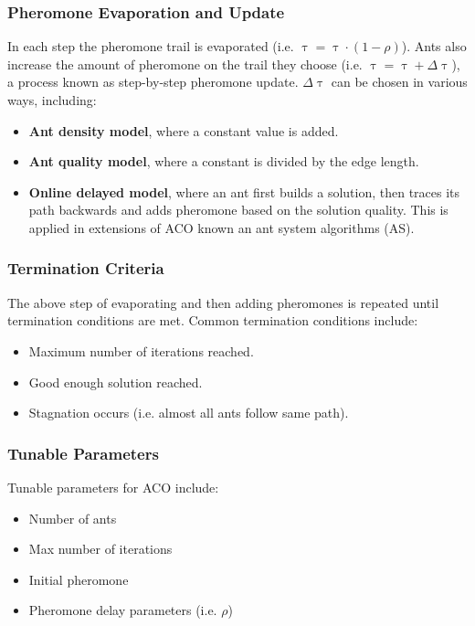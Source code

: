 \documentclass[12pt,titlepage]{article}
\begin{document}
      \subsubsection{Pheromone Evaporation and Update}
        In each step the pheromone trail is evaporated (i.e. $\uptau = \uptau \cdot (1 - \rho)$). Ants also increase the amount of pheromone on the trail they choose
        (i.e. $\uptau = \uptau + \Delta \uptau$), a process known as step-by-step pheromone update. $\Delta \uptau$ can be chosen in various ways, including:
        \begin{itemize}
          \item \textbf{Ant density model}, where a constant value is added.
          \item \textbf{Ant quality model}, where a constant is divided by the edge length.
          \item \textbf{Online delayed model}, where an ant first builds a solution, then traces its path backwards and adds pheromone based on the solution quality.
            This is applied in extensions of ACO known an ant system algorithms (AS).
        \end{itemize}

      \subsubsection{Termination Criteria}
        The above step of evaporating and then adding pheromones is repeated until termination conditions are met. Common termination conditions include:
        \begin{itemize}
          \item Maximum number of iterations reached.
          \item Good enough solution reached.
          \item Stagnation occurs (i.e. almost all ants follow same path).
        \end{itemize}

      \subsubsection{Tunable Parameters}
        Tunable parameters for ACO include:
        \begin{itemize}
          \item Number of ants
          \item Max number of iterations
          \item Initial pheromone
          \item Pheromone delay parameters (i.e. $\rho$)
        \end{itemize}
\end{document}
